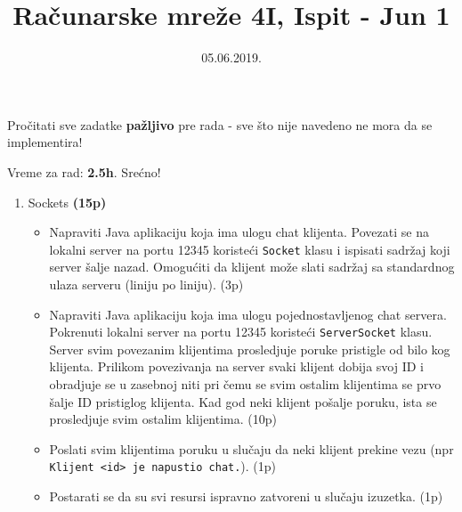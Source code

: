 \documentclass[]{article}
\title{Ra\v{c}unarske mre\v{z}e 4I, Ispit - Jun 1}
\date{05.06.2019.}
\begin{document}
\makeatletter
\begin{center}

{\fontsize{12pt}{14pt}\selectfont\bfseries\@title\par}
\@date

Pro\v{c}itati sve zadatke \textbf{pa\v{z}ljivo} pre rada - sve \v{s}to nije navedeno ne mora da se implementira! 

Vreme za rad: \textbf{2.5h}. Sre\'{c}no!
\end{center}
\makeatother


\begin{enumerate}
  \item Sockets \textbf{(15p)}
  \begin{itemize}
    \item Napraviti Java aplikaciju koja ima ulogu chat klijenta. Povezati se na lokalni server na portu 12345 koriste\'c{}i \texttt{Socket} klasu i ispisati sadr\v{z}aj koji server \v{s}alje nazad. Omogu\'c{}iti da klijent mo\v{z}e slati sadr\v{z}aj sa standardnog ulaza serveru (liniju po liniju). \hfill (3p)
    \item Napraviti Java aplikaciju koja ima ulogu pojednostavljenog chat servera. Pokrenuti lokalni server na portu 12345 koriste\'c{}i \texttt{ServerSocket} klasu. Server svim povezanim klijentima prosledjuje poruke pristigle od bilo kog klijenta. Prilikom povezivanja na server svaki klijent dobija svoj ID i obradjuje se u zasebnoj niti pri \v{c}emu se svim ostalim klijentima se prvo \v{s}alje ID pristiglog klijenta. Kad god neki klijent po\v{s}alje poruku, ista se prosledjuje svim ostalim klijentima. \hfill (10p)
    \item Poslati svim klijentima poruku u slu\v{c}aju da neki klijent prekine vezu (npr \texttt{Klijent <id> je napustio chat.}). \hfill (1p)
    \item Postarati se da su svi resursi ispravno zatvoreni u slu\v{c}aju izuzetka. \hfill (1p)
  \end{itemize}


\end{enumerate}
\end{document}
